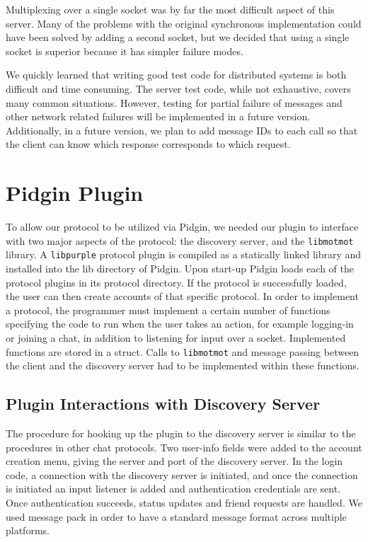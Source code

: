 \documentclass{sig-alternate}
\newcommand\libmotmot{\texttt{libmotmot}\xspace}
\newcommand\libpurple{\texttt{libpurple}\xspace}
\begin{document}
Multiplexing over a single socket was by far the most difficult aspect of this server. Many of the problems with the original synchronous implementation could have been solved by adding a second socket, but we decided that using a single socket is superior because it has simpler failure modes.

We quickly learned that writing good test code for distributed systems is both difficult and time consuming. The server test code, while not exhaustive, covers many common situations. However, testing for partial failure of messages and other network related failures will be implemented in a future version.   Additionally, in a future version, we plan to add message IDs to each call so that the client can know which response corresponds to which request.


\section{Pidgin Plugin}

To allow our protocol to be utilized via Pidgin, we needed our plugin to
interface with two major aspects of the protocol: the discovery server, and the
\libmotmot library.  A \libpurple protocol plugin is compiled as a statically
linked library and installed into the lib directory of Pidgin. Upon start-up
Pidgin loads each of the protocol plugins in its protocol directory. If the
protocol is successfully loaded, the user can then create accounts of that
specific protocol.  In order to implement a protocol, the programmer must
implement a certain number of functions specifying the code to run when the user
takes an action, for example logging-in or joining a chat, in addition to
listening for input over a socket. Implemented functions are stored in a struct.
Calls to \libmotmot and message passing between the client and the discovery
server had to be implemented within these functions.

\subsection{Plugin Interactions with Discovery Server}
The procedure for hooking up the plugin to the discovery server is similar to
the procedures in other chat protocols. Two user-info fields were added to the
account creation menu, giving the server and port of the discovery server. In
the login code, a connection with the discovery server is initiated, and once
the connection is initiated an input listener is added and authentication
credentials are sent. Once authentication succeeds, status updates and friend
requests are handled. We used message pack in order to have a standard message
format across multiple platforms.
\end{document}

